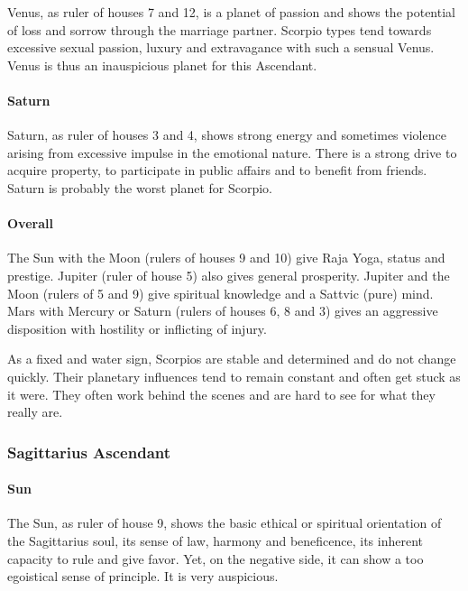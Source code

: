 Venus, as ruler of houses 7 and 12, is a planet of passion and shows the potential of loss and sorrow through the marriage partner. Scorpio types tend towards excessive sexual passion, luxury and extravagance with such a sensual Venus. Venus is thus an inauspicious planet for this Ascendant.

 

\paragraph{Saturn}

Saturn, as ruler of houses 3 and 4, shows strong energy and sometimes violence arising from excessive impulse in the emotional nature. There is a strong drive to acquire property, to participate in public affairs and to benefit from friends. Saturn is probably the worst planet for Scorpio.

 

\paragraph{Overall}

The Sun with the Moon (rulers of houses 9 and 10) give Raja Yoga, status and prestige. Jupiter (ruler of house 5) also gives general prosperity. Jupiter and the Moon (rulers of 5 and 9) give spiritual knowledge and a Sattvic (pure) mind. Mars with Mercury or Saturn (rulers of houses 6, 8 and 3) gives an aggressive disposition with hostility or inflicting of injury.

 

As a fixed and water sign, Scorpios are stable and determined and do not change quickly. Their planetary influences tend to remain constant and often get stuck as it were. They often work behind the scenes and are hard to see for what they really are.

 

\subsubsection{Sagittarius Ascendant}
 

\paragraph{Sun}

The Sun, as ruler of house 9, shows the basic ethical or spiritual orientation of the Sagittarius soul, its sense of law, harmony and beneficence, its inherent capacity to rule and give favor. Yet, on the negative side, it can show a too egoistical sense of principle. It is very auspicious.

